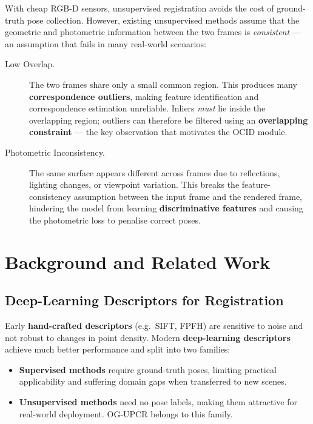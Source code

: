 \documentclass[11pt,a4paper]{article}
\begin{document}
With cheap RGB-D sensors, unsupervised registration avoids the cost of ground-truth pose
collection. However, existing unsupervised methods assume that the geometric and photometric
information between the two frames is \emph{consistent} — an assumption that fails in many
real-world scenarios:

\begin{description}
  \item[\textcolor{ProbRed}{Low Overlap.}]
    The two frames share only a small common region. This produces many
    \textbf{correspondence outliers}, making feature identification and correspondence
    estimation unreliable. Inliers \emph{must} lie inside the overlapping region; outliers
    can therefore be filtered using an \textbf{overlapping constraint} — the key observation
    that motivates the OCID module.

  \item[\textcolor{ProbRed}{Photometric Inconsistency.}]
    The same surface appears different across frames due to reflections, lighting changes, or
    viewpoint variation. This breaks the feature-consistency assumption between the input
    frame and the rendered frame, hindering the model from learning \textbf{discriminative
    features} and causing the photometric loss to penalise correct poses.
\end{description}

\section{Background and Related Work}
\label{sec:related}

\subsection{Deep-Learning Descriptors for Registration}

Early \textbf{hand-crafted descriptors} (e.g.\ SIFT, FPFH) are sensitive to noise and not
robust to changes in point density. Modern \textbf{deep-learning descriptors} achieve much
better performance and split into two families:

\begin{itemize}[noitemsep]
  \item \textbf{Supervised methods} require ground-truth poses, limiting practical
    applicability and suffering domain gaps when transferred to new scenes.
  \item \textbf{Unsupervised methods} need no pose labels, making them attractive
    for real-world deployment. OG-UPCR belongs to this family.
\end{itemize}
\end{document}
